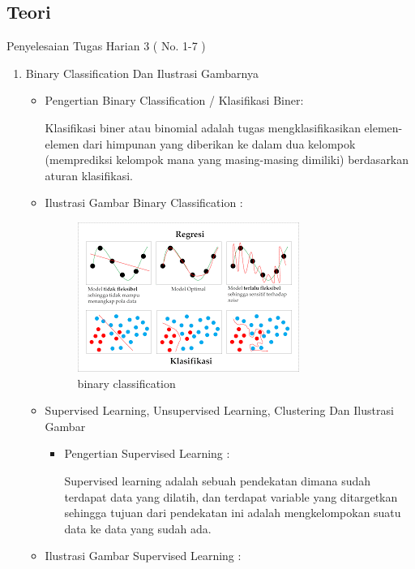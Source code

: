 \subsection{Teori}
Penyelesaian Tugas Harian 3 ( No. 1-7 )
\begin{enumerate}
\item Binary Classification Dan Ilustrasi Gambarnya
\begin{itemize}
\item Pengertian Binary Classification / Klasifikasi Biner:
\par Klasifikasi biner atau binomial adalah tugas mengklasifikasikan elemen-elemen dari himpunan yang diberikan ke dalam dua kelompok (memprediksi kelompok mana yang masing-masing dimiliki) berdasarkan aturan klasifikasi.
\item Ilustrasi Gambar Binary Classification :
\par

\begin{figure}[ht]
\centering
\includegraphics[scale=0.7]{figures/gambar1.PNG}
\caption{binary classification}
\label{gambar1}
\end{figure}

\par
\item Supervised Learning, Unsupervised Learning, Clustering Dan Ilustrasi Gambar
\begin{itemize}
\item Pengertian Supervised Learning :
\par Supervised learning adalah sebuah pendekatan dimana sudah terdapat data yang dilatih, dan terdapat variable yang ditargetkan sehingga tujuan dari pendekatan ini adalah mengkelompokan suatu data ke data yang sudah ada.
\end{itemize}
\par
\item Ilustrasi Gambar Supervised Learning :


\end{itemize}
\end{enumerate}
